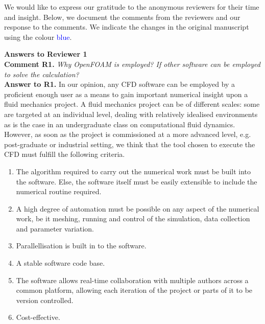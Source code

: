 \documentclass[12pt]{article}
\newcounter{question}
\newcommand{\name}{00}
\newcommand{\question}[1]{\stepcounter{question} \noindent \textbf{Comment \name.\thequestion} \emph{#1}\\}
\newcommand{\answer}[1]{\noindent \textbf{Answer to \name.\thequestion} #1 \mbox{}\\}
\newcommand{\newperson}[2]{\renewcommand{\name}{#2} \setcounter{question}{0} \noindent \textbf{\large Answers to #1} \\}
\begin{document}
We would like to express our gratitude to the anonymous reviewers for their time and insight. Below, we document the comments from the reviewers and our response to the comments. We indicate the changes in the original manuscript using the colour \textcolor{blue}{blue}.

\vspace{1cm}

% 
% 
\newperson{Reviewer 1}{R1}

\question{Why OpenFOAM is employed? If other software can be employed to solve the calculation?}

\answer{
    In our opinion, any CFD software can be employed by a proficient enough user as a means to gain important numerical insight upon a fluid mechanics project. A fluid mechanics project can be of different scales: some are targeted at an individual level, dealing with relatively idealised environments as is the case in an undergraduate class on computational fluid dynamics. However, as soon as the project is commissioned at a more advanced level, e.g. post-graduate or industrial setting, we think that the tool chosen to execute the CFD must fulfill the following criteria.

    \begin{enumerate}
        \item The algorithm required to carry out the numerical work must be built into the software. Else, the software itself must be easily extensible to include the numerical routine required. \label{enum:extensible}
        \item A high degree of automation must be possible on any aspect of the numerical work, be it meshing, running and control of the simulation, data collection and parameter variation. \label{enum:automation}
        \item Parallellisation is built in to the software. \label{enum:parallellisation}
        \item A stable software code base. \label{enum:stability}
        \item The software allows real-time collaboration with multiple authors across a common platform, allowing each iteration of the project or parts of it to be version controlled. \label{enum:collaboration}
        \item Cost-effective. \label{enum:cost}
    \end{enumerate}

}
\end{document}

